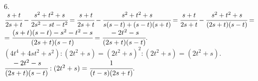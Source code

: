 6. $\cfrac{s+t}{2s+t}-\cfrac{s^2+t^2+s}{2s^2-st-t^2}=\cfrac{s+t}{2s+t}-\cfrac{s^2+t^2+s}{s(s-t)+(s-t)(s+t)}=
\cfrac{s+t}{2s+t}-\cfrac{s^2+t^2+s}{(2s+t)(s-t)}=$\\
$=\cfrac{(s+t)(s-t)-s^2-t^2-s}{(2s+t)(s-t)}=\cfrac{-2t^2-s}{(2s+t)(s-t)}.$\\
$(4t^4+4st^2+s^2):(2t^2+s)=(2t^2+s)^2:(2t^2+s)=(2t^2+s).$\\
$\cfrac{-2t^2-s}{(2s+t)(s-t)}:(2t^2+s)=\cfrac{1}{(t-s)(2s+t)}.$\\
